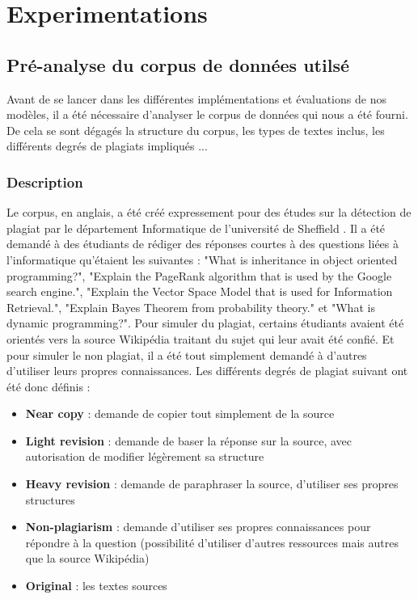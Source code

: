 \section{Experimentations}

\subsection{Pré-analyse du corpus de données utilsé}

Avant de se lancer dans les différentes implémentations et évaluations de nos modèles, il a été nécessaire d'analyser le corpus de données qui nous a été fourni. De cela se sont dégagés la structure du corpus, les types de textes inclus, les différents degrés de plagiats impliqués ...

\subsubsection{Description}

Le corpus, en anglais, a été créé expressement pour des études sur la détection de plagiat par le département Informatique de l'université de Sheffield . Il a été demandé à des étudiants de rédiger des réponses courtes à des questions liées à l'informatique qu'étaient les suivantes : "What is inheritance in object oriented programming?", "Explain the PageRank algorithm that is used by the Google search engine.", "Explain the Vector Space Model that is used for Information Retrieval.", "Explain Bayes Theorem from probability theory." et "What is dynamic programming?". Pour simuler du plagiat, certains étudiants avaient été orientés vers la source Wikipédia traitant du sujet qui leur avait été confié. Et pour simuler le non plagiat, il a été tout simplement demandé à d'autres d'utiliser leurs propres connaissances. Les différents degrés de plagiat suivant ont été donc définis :
\begin{itemize}
    \item \textbf{Near copy} : demande de copier tout simplement de la source
    \item \textbf{Light revision} : demande de baser la réponse sur la source, avec autorisation de modifier légèrement sa structure
    \item \textbf{Heavy revision} : demande de paraphraser la source, d'utiliser ses propres structures
    \item \textbf{Non-plagiarism} : demande d'utiliser ses propres connaissances pour répondre à la question (possibilité d'utiliser d'autres ressources mais autres que la source Wikipédia)
    \item \textbf{Original} : les textes sources
\end{itemize}

